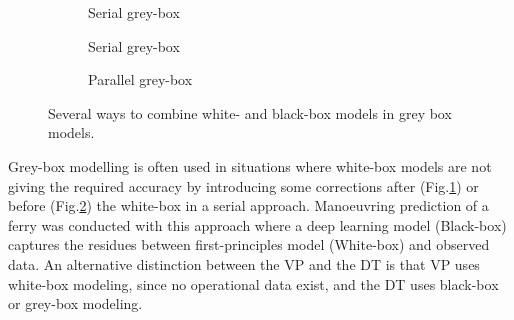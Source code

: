 \begin{figure}[H]
    \centering
    \begin{subfigure}[b]{0.3\textwidth}
    \centering
    \caption{Serial grey-box}
    \label{fig:serial1}
    \end{subfigure}

    
    \begin{subfigure}[b]{0.3\textwidth}
    \centering
    \caption{Serial grey-box}
    \label{fig:serial2}
    \end{subfigure}

    \begin{subfigure}[b]{0.3\textwidth}
    \centering
    \caption{Parallel grey-box}
    \label{fig:parallel}
    \end{subfigure}
    \caption{Several ways to combine white- and black-box models in grey box models.}
    \label{fig:greycombinations}
\end{figure}

\noindent Grey-box modelling is often used in situations where white-box models are not giving the required accuracy by introducing some corrections after (Fig.\ref{fig:serial1}) or before (Fig.\ref{fig:serial2}) the white-box in a serial approach. Manoeuvring prediction of a ferry was conducted with this approach \cite{nielsen_machine_2022} where a deep learning model (Black-box) captures the residues between first-principles model (White-box) and observed data.
An alternative distinction between the VP and the DT is that VP uses white-box modeling, since no operational data exist, and the DT uses  black-box or grey-box modeling.

